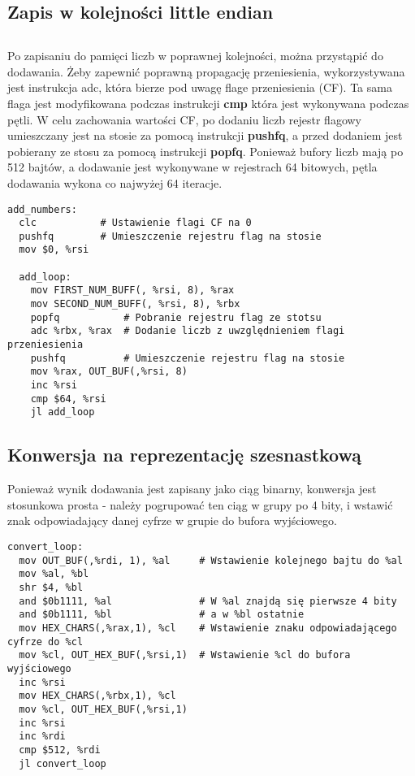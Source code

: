 \documentclass[11pt]{report}
\begin{document}
\subsection{Zapis w kolejności little endian}
\subsection{}
Po zapisaniu do pamięci liczb w poprawnej kolejności, można przystąpić do dodawania. Żeby zapewnić poprawną propagację przeniesienia, wykorzystywana jest instrukcja adc, która bierze pod uwagę flage przeniesienia (CF). Ta sama flaga jest modyfikowana podczas instrukcji \textbf{cmp} która jest wykonywana podczas pętli. W celu zachowania wartości CF, po dodaniu liczb rejestr flagowy umieszczany jest na stosie za pomocą instrukcji \textbf{pushfq}, a przed dodaniem jest pobierany ze stosu za pomocą instrukcji \textbf{popfq}. Ponieważ bufory liczb mają po 512 bajtów, a dodawanie jest wykonywane w rejestrach 64 bitowych, pętla dodawania wykona co najwyżej 64 iteracje.
\begin{verbatim}
add_numbers:
  clc           # Ustawienie flagi CF na 0
  pushfq        # Umieszczenie rejestru flag na stosie
  mov $0, %rsi
  
  add_loop:
    mov FIRST_NUM_BUFF(, %rsi, 8), %rax
    mov SECOND_NUM_BUFF(, %rsi, 8), %rbx
    popfq           # Pobranie rejestru flag ze stotsu
    adc %rbx, %rax  # Dodanie liczb z uwzględnieniem flagi przeniesienia
    pushfq          # Umieszczenie rejestru flag na stosie
    mov %rax, OUT_BUF(,%rsi, 8)
    inc %rsi
    cmp $64, %rsi
    jl add_loop
\end{verbatim}
\subsection{Konwersja na reprezentację szesnastkową}
Ponieważ wynik dodawania jest zapisany jako ciąg binarny, konwersja jest stosunkowa prosta - należy pogrupować ten ciąg w grupy po 4 bity, i wstawić znak odpowiadający danej cyfrze w grupie do bufora wyjściowego.
\begin{verbatim}
convert_loop:
  mov OUT_BUF(,%rdi, 1), %al     # Wstawienie kolejnego bajtu do %al
  mov %al, %bl						
  shr $4, %bl
  and $0b1111, %al               # W %al znajdą się pierwsze 4 bity  
  and $0b1111, %bl               # a w %bl ostatnie
  mov HEX_CHARS(,%rax,1), %cl    # Wstawienie znaku odpowiadającego cyfrze do %cl
  mov %cl, OUT_HEX_BUF(,%rsi,1)  # Wstawienie %cl do bufora wyjściowego
  inc %rsi
  mov HEX_CHARS(,%rbx,1), %cl
  mov %cl, OUT_HEX_BUF(,%rsi,1)
  inc %rsi
  inc %rdi
  cmp $512, %rdi
  jl convert_loop
\end{verbatim}
\end{document}
